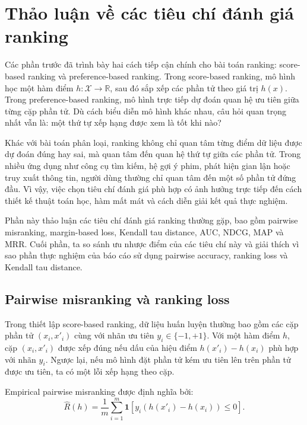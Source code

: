 \section{Thảo luận về các tiêu chí đánh giá ranking}

Các phần trước đã trình bày hai cách tiếp cận chính cho bài toán ranking: score-based ranking và preference-based ranking. Trong score-based ranking, mô hình học một hàm điểm \(h: \mathcal{X} \to \mathbb{R}\), sau đó sắp xếp các phần tử theo giá trị \(h(x)\). Trong preference-based ranking, mô hình trực tiếp dự đoán quan hệ ưu tiên giữa từng cặp phần tử. Dù cách biểu diễn mô hình khác nhau, câu hỏi quan trọng nhất vẫn là: một thứ tự xếp hạng được xem là tốt khi nào?

Khác với bài toán phân loại, ranking không chỉ quan tâm từng điểm dữ liệu được dự đoán đúng hay sai, mà quan tâm đến quan hệ thứ tự giữa các phần tử. Trong nhiều ứng dụng như công cụ tìm kiếm, hệ gợi ý phim, phát hiện gian lận hoặc truy xuất thông tin, người dùng thường chỉ quan tâm đến một số phần tử đứng đầu. Vì vậy, việc chọn tiêu chí đánh giá phù hợp có ảnh hưởng trực tiếp đến cách thiết kế thuật toán học, hàm mất mát và cách diễn giải kết quả thực nghiệm.

Phần này thảo luận các tiêu chí đánh giá ranking thường gặp, bao gồm pairwise misranking, margin-based loss, Kendall tau distance, AUC, NDCG, MAP và MRR. Cuối phần, ta so sánh ưu nhược điểm của các tiêu chí này và giải thích vì sao phần thực nghiệm của báo cáo sử dụng pairwise accuracy, ranking loss và Kendall tau distance.

\subsection{Pairwise misranking và ranking loss}

Trong thiết lập score-based ranking, dữ liệu huấn luyện thường bao gồm các cặp phần tử \((x_i, x'_i)\) cùng với nhãn ưu tiên \(y_i \in \{-1,+1\}\). Với một hàm điểm \(h\), cặp \((x_i, x'_i)\) được xếp đúng nếu dấu của hiệu điểm \(h(x'_i)-h(x_i)\) phù hợp với nhãn \(y_i\). Ngược lại, nếu mô hình đặt phần tử kém ưu tiên lên trên phần tử được ưu tiên, ta có một lỗi xếp hạng theo cặp.

Empirical pairwise misranking được định nghĩa bởi:
\begin{equation}
    \widehat{R}(h)
    =
    \frac{1}{m}
    \sum_{i=1}^{m}
    \mathbf{1}
    \left[
        y_i(h(x'_i)-h(x_i)) \leq 0
    \right].
    \label{eq:discussion-empirical-pairwise-misranking}
\end{equation}

